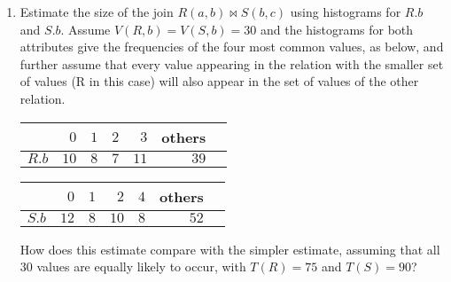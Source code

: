 


\newcommand{\subtitle}{\textbf{Exercise 5}}
\newcommand{\outdate}{20.11.2023}
\newcommand{\duedate}{27.11.2023 12:00 MEZ}
\newcommand{\video}{027}






\begin{enumerate}

  \item Estimate the size of the join $R(a,b) \Join S(b,c)$ using histograms for $R.b$ and $S.b$. Assume $V(R,b) = V(S,b) = 30$ and the histograms
        for both attributes give the frequencies of the four most common values, as below, and further assume that every value appearing in the relation with the smaller set of values (R in this case) will also appear in the set of values of the other relation.

        \begin{minipage}{.49\textwidth}
          \begin{center}
            \begin{tabular}{|c|r|r|r|r|r|r}
                    & $0$   & $1$ & $2$ & $3$  & others \\\hline
              $R.b$ & $10 $ & $8$ & $7$ & $11$ & $39$   \\

            \end{tabular}
          \end{center}
        \end{minipage}
        \begin{minipage}{.49\textwidth}
          \begin{center}
            \begin{tabular}{|c|r|r|r|r|r|r}
                    & $0$   & $1$ & $2$  & $4$ & others \\\hline
              $S.b$ & $12 $ & $8$ & $10$ & $8$ & $52$   \\

            \end{tabular}
          \end{center}
        \end{minipage}

        How does this estimate compare with the simpler estimate, assuming that all $30$ values are equally likely to occur, with $T(R)=75$ and $T(S)=90$?


\end{enumerate}
